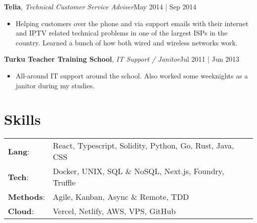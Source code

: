 \documentclass[line,margin]{res}
\begin{document}
\begin{resume}
	\textbf{Telia}, {\sl Technical Customer Service Adviser}\hfill May 2014 | Sep 2014\\
	\begin{itemize} \itemsep 3pt
	\item Helping customers over the phone and via support emails with their internet and IPTV related technical problems in one of the largest ISPs in the country. Learned a bunch of how both wired and wireless networks work.
	\end{itemize}

	\textbf{Turku Teacher Training School}, {\sl IT Support / Janitor}\hfill Jul 2011 | Jun 2013\\
	\begin{itemize} \itemsep 3pt
	\item All-around IT support around the school. Also worked some weeknights as a janitor during my studies.
	\end{itemize}

	\section{Skills}
	\begin{tabular}{@{}ll}
		\textbf{Lang}:    & React, Typescript, Solidity, Python, Go, Rust, Java, CSS \\
		\textbf{Tech}:    & Docker, UNIX, SQL \& NoSQL, Next.js, Foundry, Truffle    \\
		\textbf{Methods}: & Agile, Kanban, Async \& Remote, TDD                      \\
		\textbf{Cloud}:   & Vercel, Netlify, AWS, VPS, GitHub                        \\
	\end{tabular}

\end{resume}
\end{document}
